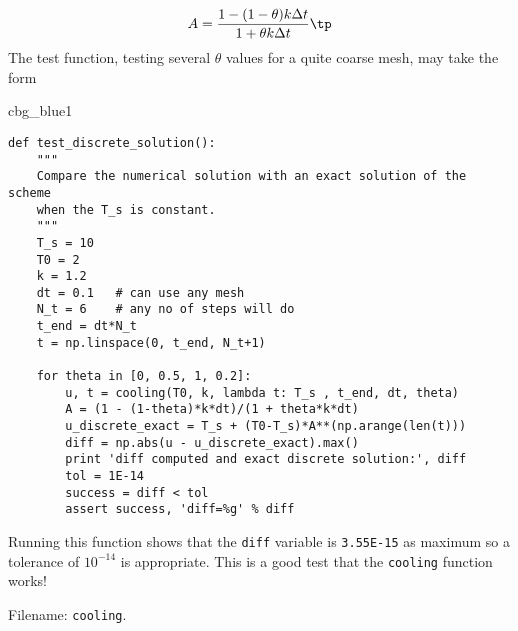 \documentclass[graybox,sectrefs,envcountresetchap,open=right,final]{svmonodo}
\newenvironment{_cod_tight}[1]{
   \def\FrameCommand{\colorbox{#1}}
   \FrameRule0.6pt\MakeFramed {\FrameRestore}\vskip3mm}
   {\vskip0mm\endMakeFramed}
\newenvironment{cod}[1]{
\bgroup\rmfamily
\fboxsep=0mm\relax
\begin{_cod_tight}{#1}
\list{}{\parsep=-2mm\parskip=0mm\topsep=0pt\leftmargin=2mm
\rightmargin=2\leftmargin\leftmargin=4pt\relax}
\item\relax}
{\endlist\end{_cod_tight}\egroup}
\newenvironment{doconceexercise}{}{}
\begin{document}
\begin{doconceexercise}
\[ A = \frac{1 - (1-\theta) k\Delta t}{1 + \theta k\Delta t}\tp\]
The test function, testing several $\theta$ values for a quite coarse
mesh, may take the form

\begin{cod}{cbg_blue1}\begin{Verbatim}[numbers=none,fontsize=\fontsize{9pt}{9pt},baselinestretch=0.95,xleftmargin=2mm]
def test_discrete_solution():
    """
    Compare the numerical solution with an exact solution of the scheme
    when the T_s is constant.
    """
    T_s = 10
    T0 = 2
    k = 1.2
    dt = 0.1   # can use any mesh
    N_t = 6    # any no of steps will do
    t_end = dt*N_t
    t = np.linspace(0, t_end, N_t+1)

    for theta in [0, 0.5, 1, 0.2]:
        u, t = cooling(T0, k, lambda t: T_s , t_end, dt, theta)
        A = (1 - (1-theta)*k*dt)/(1 + theta*k*dt)
        u_discrete_exact = T_s + (T0-T_s)*A**(np.arange(len(t)))
        diff = np.abs(u - u_discrete_exact).max()
        print 'diff computed and exact discrete solution:', diff
        tol = 1E-14
        success = diff < tol
        assert success, 'diff=%g' % diff
\end{Verbatim}
\end{cod}
\noindent
Running this function shows that the \texttt{diff} variable is \texttt{3.55E-15}
as maximum so a tolerance of $10^{-14}$ is appropriate.
This is a good test that the \texttt{cooling} function works!


\noindent Filename: \texttt{cooling}.

\end{doconceexercise}
\end{document}
